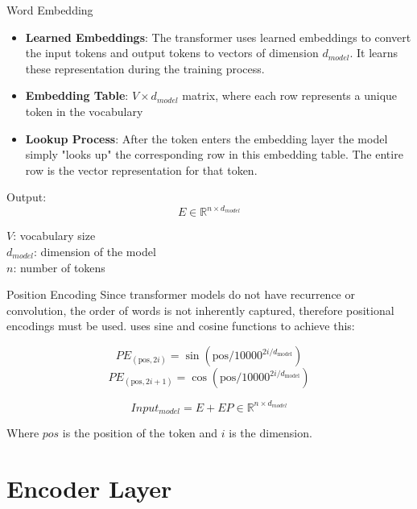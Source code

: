 \documentclass{beamer}
\begin{document}
\begin{frame}{Word Embedding}
\begin{itemize}
    \item \textbf{Learned Embeddings}: The transformer uses learned embeddings to convert the input tokens and output tokens to vectors of dimension $d_{model}$. It learns these representation during the training process.
    \item \textbf{Embedding Table}: $V \times d_{model}$ matrix, where each row represents a unique token in the vocabulary
    \item \textbf{Lookup Process}: After the token enters the embedding layer the model simply "looks up" the corresponding row in this embedding table. The entire row is the vector representation for that token.
\end{itemize}


\vspace{1em}
Output:
$$E \in \mathbb{R}^{n \times d_{model}}$$


$V$: vocabulary size \\ $d_{model}$: dimension of the model \\ $n$: number of tokens
    
\end{frame}

\begin{frame}{Position Encoding}
Since transformer models do not have recurrence or convolution, the order of words is not inherently captured, therefore positional encodings must be used. \cite{vaswani2017attention} uses sine and cosine functions to achieve this:

$$ PE_{(\text{pos},2i)} = \sin(\text{pos}/10000^{2i/d_{\text{model}}}) $$
$$ PE_{(\text{pos},2i+1)} = \cos(\text{pos}/10000^{2i/d_{\text{model}}}) $$

$$Input_{model} = E + EP \in \mathbb{R}^{n \times d_{model}}$$

\vspace{1em}
Where $pos$ is the position of the token and $i$ is the dimension.
    
\end{frame}

\section{Encoder Layer}
\end{document}
